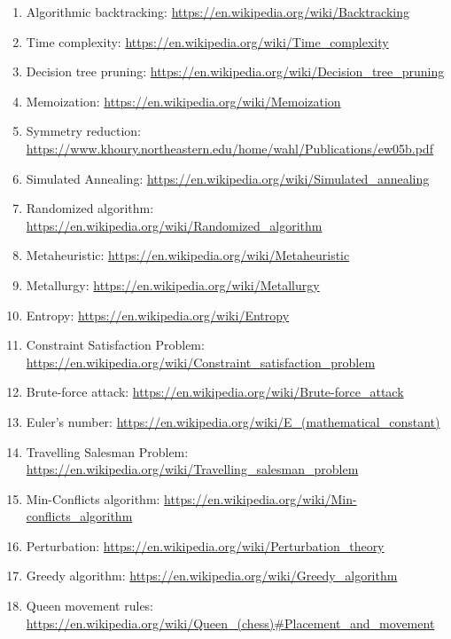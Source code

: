 \documentclass{article}
\begin{document}
\begin{enumerate}
    \item Algorithmic backtracking: \url{https://en.wikipedia.org/wiki/Backtracking}
    \item Time complexity: \url{https://en.wikipedia.org/wiki/Time_complexity}
    \item Decision tree pruning: \url{https://en.wikipedia.org/wiki/Decision_tree_pruning}
    \item Memoization: \url{https://en.wikipedia.org/wiki/Memoization}
    \item Symmetry reduction: \url{https://www.khoury.northeastern.edu/home/wahl/Publications/ew05b.pdf}
    \item Simulated Annealing: \url{https://en.wikipedia.org/wiki/Simulated_annealing}
    \item Randomized algorithm: \url{https://en.wikipedia.org/wiki/Randomized_algorithm}
    \item Metaheuristic: \url{https://en.wikipedia.org/wiki/Metaheuristic}
    \item Metallurgy: \url{https://en.wikipedia.org/wiki/Metallurgy}
    \item Entropy: \url{https://en.wikipedia.org/wiki/Entropy}
    \item Constraint Satisfaction Problem: \url{https://en.wikipedia.org/wiki/Constraint\_satisfaction\_problem}
    \item Brute-force attack: \url{https://en.wikipedia.org/wiki/Brute-force_attack}
    \item Euler's number: \url{https://en.wikipedia.org/wiki/E_(mathematical_constant)}
    \item Travelling Salesman Problem: \url{https://en.wikipedia.org/wiki/Travelling_salesman_problem}
    \item Min-Conflicts algorithm: \url{https://en.wikipedia.org/wiki/Min-conflicts_algorithm}
    \item Perturbation: \url{https://en.wikipedia.org/wiki/Perturbation_theory}
    \item Greedy algorithm: \url{https://en.wikipedia.org/wiki/Greedy_algorithm}
    \item Queen movement rules: \url{https://en.wikipedia.org/wiki/Queen_(chess)\#Placement\_and\_movement}
\end{enumerate}
\end{document}
